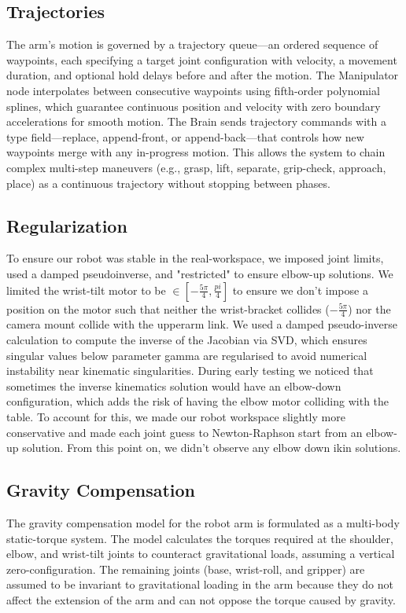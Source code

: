 \subsection{Trajectories}
The arm's motion is governed by a trajectory queue---an ordered sequence of waypoints, each specifying a target joint configuration with velocity, a movement duration, and optional hold delays before and after the motion. The Manipulator node interpolates between consecutive waypoints using fifth-order polynomial splines, which guarantee continuous position and velocity with zero boundary accelerations for smooth motion. The Brain sends trajectory commands with a type field---replace, append-front, or append-back---that controls how new waypoints merge with any in-progress motion. This allows the system to chain complex multi-step maneuvers (e.g., grasp, lift, separate, grip-check, approach, place) as a continuous trajectory without stopping between phases.

\subsection{Regularization}
To ensure our robot was stable in the real-workspace, we imposed joint limits, used a damped pseudoinverse, and "restricted" to ensure elbow-up solutions. We limited the wrist-tilt motor to be $\in [-\frac{5\pi}{4}, \frac{pi}{4}]$ to ensure we don't impose a position on the motor such that neither the wrist-bracket collides ($-\frac{5\pi}{4}$) nor the camera mount collide with the upperarm link. We used a damped pseudo-inverse calculation to compute the inverse of the Jacobian via SVD, which ensures singular values below parameter gamma are regularised to avoid numerical instability near kinematic singularities. During early testing we noticed that sometimes the inverse kinematics solution would have an elbow-down configuration, which adds the risk of having the elbow motor colliding with the table. To account for this, we made our robot workspace slightly more conservative and made each joint guess to Newton-Raphson start from an elbow-up solution. From this point on, we didn't observe any elbow down ikin solutions.

\subsection{Gravity Compensation}

The gravity compensation model for the robot arm is formulated as a multi-body static-torque system. The model calculates the torques required at the shoulder, elbow, and wrist-tilt joints to counteract gravitational loads, assuming a vertical zero-configuration. The remaining joints (base, wrist-roll, and gripper) are assumed to be invariant to gravitational loading in the arm because they do not affect the extension of the arm and can not oppose the torque caused by gravity.

